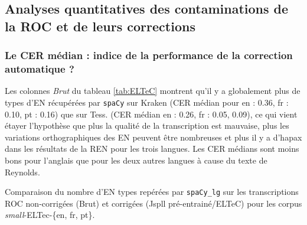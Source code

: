 
%    

%    


\subsection{Analyses quantitatives des contaminations de la ROC et de leurs corrections}
\label{subsec:quantitative_COR-OCR-IMPACT-NER}
\subsubsection{Le CER médian : indice de la performance de la correction automatique ?}
\label{subsubsec:seuil}
Les colonnes \textit{Brut} du tableau \ref{tab:ELTeC} montrent qu'il y a globalement plus de types d'EN récupérées par \texttt{spaCy} sur Kraken (CER médian pour en : 0.36, fr : 0.10, pt : 0.16) que sur Tess. (CER médian en : 0.26, fr : 0.05, 0.09), ce qui vient étayer l'hypothèse que plus la qualité de la transcription est mauvaise, plus les variations orthographiques des EN peuvent être nombreuses et plus il y a d'hapax dans les résultats de la REN pour les trois langues. Les CER médians sont moins bons pour l'anglais que pour les deux autres langues à cause du texte de Reynolds.
\begin{table}[h!]
    \centering
    \scriptsize
    
    \caption{Comparaison du nombre d'EN types repérées par \texttt{spaCy\_lg} sur les transcriptions ROC non-corrigées (Brut) et corrigées (Jspll pré-entrainé/ELTeC) pour les corpus \textit{small}-ELTec-\{en, fr, pt\}.}
    \label{tab:ELTeC}
\end{table} 


